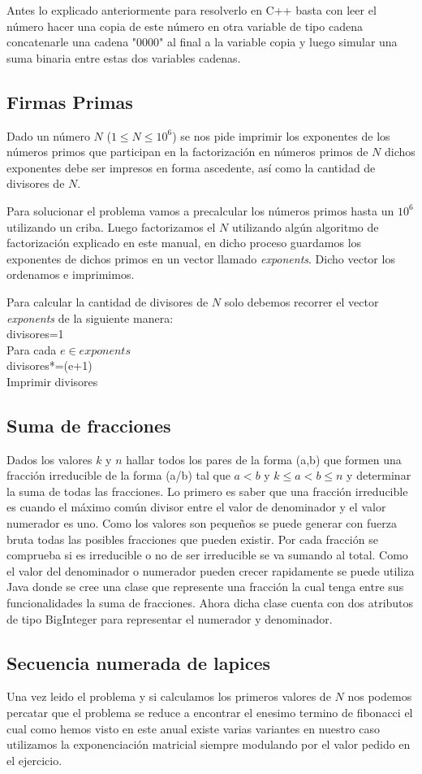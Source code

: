 Antes lo explicado anteriormente para resolverlo en C++ basta con leer el número hacer una copia de este número en otra variable de tipo cadena concatenarle una cadena "0000" al final a la variable copia y luego simular una suma binaria entre estas dos variables cadenas.

\subsection{Firmas Primas} Dado un número $N$ ($1 \leq N \leq 10^{6}$) se nos pide imprimir los exponentes de los números primos que participan en la factorización en números primos de $N$ dichos exponentes debe ser impresos en forma ascedente, así como la cantidad de divisores de $N$.

Para solucionar el problema vamos a precalcular los números primos hasta un $10^{6}$ utilizando un criba. Luego factorizamos el $N$ utilizando algún algoritmo de factorización explicado en este manual, en dicho proceso guardamos los exponentes de dichos primos en un vector llamado \emph{exponents}. Dicho vector los ordenamos e imprimimos. 

Para calcular la cantidad de divisores de $N$ solo debemos recorrer el vector \emph{exponents} de la siguiente manera:\\
divisores=1\\
Para cada  $ e \in exponents$\\
\hspace*{0.3in}divisores*=(e+1)\\
Imprimir divisores\\


\subsection{Suma de fracciones} Dados los valores $k$ y $n$ hallar todos los pares de la forma (a,b) que formen una fracción irreducible de la forma (a/b) tal que $a < b$ y $k \leq a < b \leq n$ y determinar la suma de todas las fracciones. Lo primero es saber que una fracción irreducible es cuando el máximo común divisor entre el valor de denominador y el valor numerador es uno. Como los valores son pequeños se puede generar con fuerza bruta todas las posibles fracciones que pueden existir. Por cada fracción se comprueba si es irreducible o no de ser irreducible se va sumando al total. Como el valor del denominador o numerador pueden crecer rapidamente se puede utiliza Java donde se cree una clase que represente una fracción la cual tenga entre sus funcionalidades la suma de fracciones. Ahora dicha clase cuenta con dos atributos de tipo BigInteger para representar el numerador y denominador.

\subsection{Secuencia numerada de lapices} Una vez leido el problema y si calculamos los primeros valores de $N$ nos podemos percatar que el problema se reduce a encontrar el enesimo termino de fibonacci el cual como hemos visto en este anual existe varias variantes en nuestro caso utilizamos la exponenciación matricial siempre modulando por el valor pedido en el ejercicio. 
